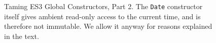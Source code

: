 \documentclass[letterpaper,twocolumn,10pt]{article}
\newcommand{\code}[1]{{\tt {#1}}}              %
\begin{document}
\begin{figure}
\begin{tabular}{lll}
\end{tabular}

\caption[Taming ES3 Global Constructors, Part 2.]{Taming ES3 Global
Constructors, Part 2. The \code{Date} constructor itself gives ambient
read-only access to the current time, and is therefore not immutable.
We allow it anyway for reasons explained in the text.} 

\label{tab:taming-es3-2}
\end{figure}




\end{document}
